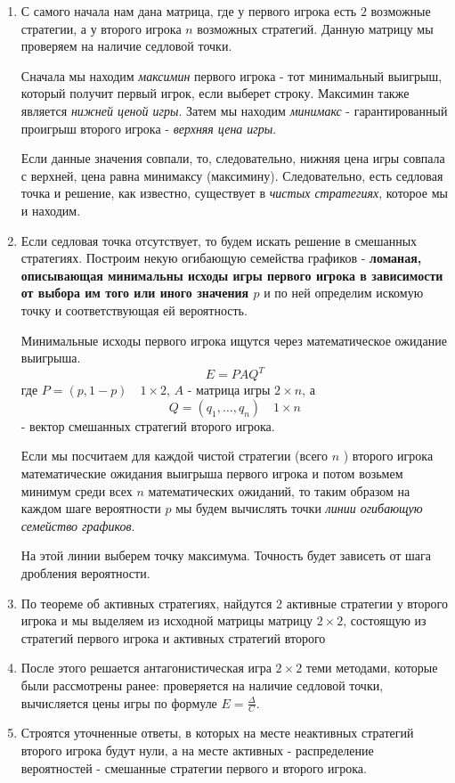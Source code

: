 \documentclass[aps,%
12pt,%
final,%
oneside,
onecolumn,%
musixtex, %
superscriptaddress,%
centertags]{article} %
\theoremstyle{plain}
\theoremstyle{definition}
\theoremstyle{remark}
\begin{document}
\begin{enumerate}
  \item С самого начала нам дана матрица, где у первого игрока есть $2$ возможные стратегии, а у второго игрока $n$ возможных стратегий. Данную матрицу мы проверяем на наличие седловой точки. 

  Сначала мы находим \textit{максимин} первого игрока - тот минимальный выигрыш, который получит первый игрок, если выберет строку. Максимин также является \textit{нижней ценой игры}. Затем мы находим \textit{минимакс} - гарантированный проигрыш второго игрока - \textit{верхняя цена игры}. 

  Если данные значения совпали, то, следовательно, нижняя цена игры совпала с верхней, цена равна минимаксу (максимину). Следовательно, есть седловая точка и решение, как известно, существует в \textit{чистых стратегиях}, которое мы и находим.

  \item Если седловая точка отсутствует, то будем искать решение в смешанных стратегиях. Построим некую огибающую семейства графиков - \textbf{ломаная, описывающая минимальны исходы игры первого игрока в зависимости от выбора им того или иного значения $p$} и по ней определим искомую точку и соответствующая ей вероятность. 

  Минимальные исходы первого игрока ищутся через математическое ожидание выигрыша. 
  $$E = PAQ^T$$
  где $P=(p,1-p) \quad 1 \times 2$, $A$ - матрица игры $2 \times n$, а $$Q = (q_1,\ldots,q_n) \quad 1 \times n$$ - вектор смешанных стратегий второго игрока. 

  Если мы посчитаем для каждой чистой стратегии (всего $n$ ) второго игрока математические ожидания выигрыша первого игрока и потом возьмем минимум среди всех $n$ математических ожиданий, то таким образом на каждом шаге вероятности $p$ мы будем вычислять точки \textit{линии огибающую семейство графиков}.

  На этой линии выберем точку максимума. Точность будет зависеть от шага дробления вероятности.
  \item По теореме об активных стратегиях, найдутся $2$ активные стратегии у второго игрока и мы выделяем из исходной матрицы матрицу $2 \times 2$, состоящую из стратегий первого игрока и активных стратегий второго
  \item После этого решается антагонистическая игра $2 \times 2$ теми методами, которые были рассмотрены ранее: проверяется на наличие седловой точки, вычисляется цены игры по формуле $E=\frac{\Delta}{C}$.
  \item Строятся уточненные ответы, в которых на месте неактивных стратегий второго игрока будут нули, а на месте активных - распределение вероятностей - смешанные стратегии первого и второго игрока.
\end{enumerate}
\end{document}
